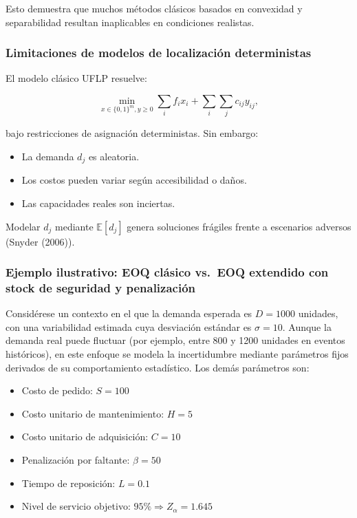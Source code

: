 \documentclass[
  spanish,
  us-letterpaper,
  DIV=11,
  numbers=noendperiod]{scrreprt}
\providecommand{\tightlist}{%
  \setlength{\itemsep}{0pt}\setlength{\parskip}{0pt}}
\numberwithin{equation}{section}
\begin{document}
Esto demuestra que muchos métodos clásicos basados en convexidad y
separabilidad resultan inaplicables en condiciones realistas.

\subsubsection{Limitaciones de modelos de localización
deterministas}\label{limitaciones-de-modelos-de-localizaciuxf3n-deterministas}

El modelo clásico UFLP resuelve:

\[
\min_{x\in\{0,1\}^m, y\ge 0}\sum_{i}f_i x_i + \sum_{i}\sum_j c_{ij}y_{ij},
\]

bajo restricciones de asignación deterministas. Sin embargo:

\begin{itemize}
\tightlist
\item
  La demanda \(d_j\) es aleatoria.
\item
  Los costos pueden variar según accesibilidad o daños.
\item
  Las capacidades reales son inciertas.
\end{itemize}

Modelar \(d_j\) mediante \(\mathbb{E}[d_j]\) genera soluciones frágiles
frente a escenarios adversos (Snyder (2006)).

\subsubsection{Ejemplo ilustrativo: EOQ clásico vs.~EOQ extendido con
stock de seguridad y
penalización}\label{ejemplo-ilustrativo-eoq-cluxe1sico-vs.-eoq-extendido-con-stock-de-seguridad-y-penalizaciuxf3n}

Considérese un contexto en el que la demanda esperada es \(D=1000\)
unidades, con una variabilidad estimada cuya desviación estándar es
\(\sigma=10\). Aunque la demanda real puede fluctuar (por ejemplo, entre
800 y 1200 unidades en eventos históricos), en este enfoque se modela la
incertidumbre mediante parámetros fijos derivados de su comportamiento
estadístico. Los demás parámetros son:

\begin{itemize}
\tightlist
\item
  Costo de pedido: \(S=100\)\\
\item
  Costo unitario de mantenimiento: \(H=5\)\\
\item
  Costo unitario de adquisición: \(C=10\)\\
\item
  Penalización por faltante: \(\beta=50\)\\
\item
  Tiempo de reposición: \(L=0.1\)\\
\item
  Nivel de servicio objetivo: \(95\%\Rightarrow Z_{\alpha}=1.645\)
\end{itemize}
\end{document}
